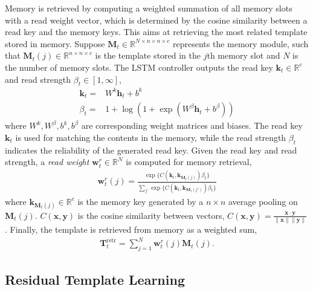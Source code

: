 \documentclass[runningheads]{llncs}
\begin{document}
Memory is retrieved by computing a weighted summation of all memory slots with a read weight vector, which is determined by the cosine similarity between a read key and the memory keys. This aims at retrieving the most related template stored in memory.
Suppose $\mathbf{M}_t \in \mathbb{R}^{N\times n \times n \times c}$ represents the memory module,  such that $\mathbf{M}_t(j) \in \mathbb{R}^{n \times n \times c}$ is the template stored in the $j\text{th}$ memory slot and $N$ is the number of memory slots. 
%
The LSTM controller outputs the read key $\mathbf{k}_t \in \mathbb{R}^{c}$ and read strength $\beta_t \in [1,\infty]$,
\begin{align}
\mathbf{k}_t = & W^k\mathbf{h}_{t}+b^k \\
\beta_t = & 1+\log(1+\exp(W^\beta \mathbf{h}_{t}+b^\beta))
\end{align}
where %
$W^k, W^\beta, b^k, b^\beta$ are corresponding weight matrices and biases.
The read key $\mathbf{k}_t$ is used for matching the contents in the memory, while the read strength $\beta_t$ indicates the reliability of the generated read key. 
%
Given the read key and read strength, a \textit{read weight} $\mathbf{w}^r_t\in \mathbb{R}^{N}$ is computed for memory retrieval,
\begin{align}
\mathbf{w}^r_t(j) =\frac{\exp{\{C(\mathbf{k}_t, \mathbf{k}_{\mathbf{M}_t(j)})}\beta_t\}}{\sum_{j'} \exp{\{C(\mathbf{k}_t, \mathbf{k}_{\mathbf{M}_t(j')})}\beta_t\}}
\end{align}
where $\mathbf{k}_{\mathbf{M}_t(j)} \in \mathbb{R}^{c}$ is the memory key generated by a $n\times n$ average pooling on $\mathbf{M}_t(j)$. $C(\mathbf{x}, \mathbf{y})$ is the  cosine similarity between vectors, 
$C(\mathbf{x},\mathbf{y})= \frac{\mathbf{x} \cdot \mathbf{y}}{\|\mathbf{x}\|\|\mathbf{y}\|}$.
Finally, the template is retrieved from memory as a weighted sum,
\begin{align}
\mathbf{T}^{\text{retr}}_t=\sum_{j=1}^N\mathbf{w}^r_t(j)\mathbf{M}_t(j).
\end{align}

\subsection{Residual Template Learning}
\end{document}
